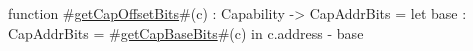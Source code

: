 function #\hyperref[sailRISCVzgetCapOffsetBits]{getCapOffsetBits}#(c) : Capability -> CapAddrBits =
    let base : CapAddrBits = #\hyperref[sailRISCVzgetCapBaseBits]{getCapBaseBits}#(c) in
    c.address - base
